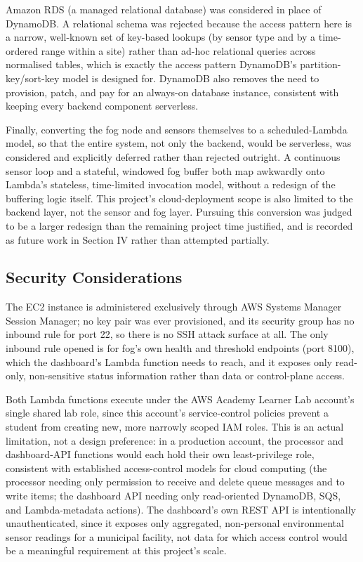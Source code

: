 \documentclass[conference]{IEEEtran}
\begin{document}
Amazon RDS (a managed relational database) was considered in place of DynamoDB. A relational schema was rejected because the access pattern here is a narrow, well-known set of key-based lookups (by sensor type and by a time-ordered range within a site) rather than ad-hoc relational queries across normalised tables, which is exactly the access pattern DynamoDB's partition-key/sort-key model is designed for. DynamoDB also removes the need to provision, patch, and pay for an always-on database instance, consistent with keeping every backend component serverless.

Finally, converting the fog node and sensors themselves to a scheduled-Lambda model, so that the entire system, not only the backend, would be serverless, was considered and explicitly deferred rather than rejected outright. A continuous sensor loop and a stateful, windowed fog buffer both map awkwardly onto Lambda's stateless, time-limited invocation model, without a redesign of the buffering logic itself. This project's cloud-deployment scope is also limited to the backend layer, not the sensor and fog layer. Pursuing this conversion was judged to be a larger redesign than the remaining project time justified, and is recorded as future work in Section IV rather than attempted partially.

\subsection{Security Considerations}
The EC2 instance is administered exclusively through AWS Systems Manager Session Manager; no key pair was ever provisioned, and its security group has no inbound rule for port 22, so there is no SSH attack surface at all. The only inbound rule opened is for fog's own health and threshold endpoints (port 8100), which the dashboard's Lambda function needs to reach, and it exposes only read-only, non-sensitive status information rather than data or control-plane access.

Both Lambda functions execute under the AWS Academy Learner Lab account's single shared lab role, since this account's service-control policies prevent a student from creating new, more narrowly scoped IAM roles. This is an actual limitation, not a design preference: in a production account, the processor and dashboard-API functions would each hold their own least-privilege role, consistent with established access-control models for cloud computing \cite{ref17} (the processor needing only permission to receive and delete queue messages and to write items; the dashboard API needing only read-oriented DynamoDB, SQS, and Lambda-metadata actions). The dashboard's own REST API is intentionally unauthenticated, since it exposes only aggregated, non-personal environmental sensor readings for a municipal facility, not data for which access control would be a meaningful requirement at this project's scale.
\end{document}
